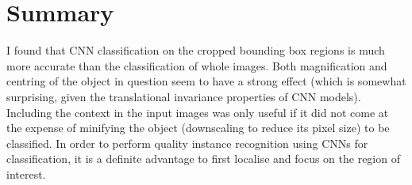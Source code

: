 \section{Summary}

I found that CNN classification on the cropped bounding box regions is much more accurate than the classification of whole images. Both magnification and centring of the object in question seem to have a strong effect (which is somewhat surprising, given the translational invariance properties of CNN models). Including the context in the input images was only useful if it did not come at the expense of minifying the object (downscaling to reduce its pixel size) to be classified. In order to perform quality instance recognition using \gls{CNN}s for classification, it is a definite advantage to first localise and focus on the region of interest.  



